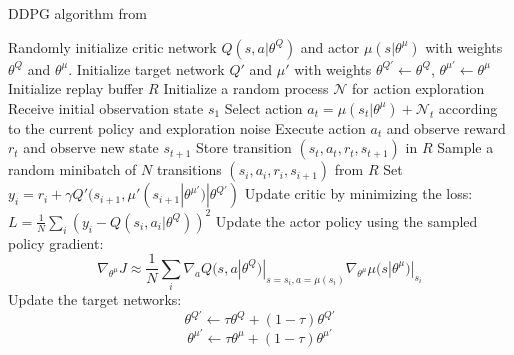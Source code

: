 \begin{algorithm}[H]
  \caption{DDPG algorithm from \cite{lillicrap2019continuouscontroldeepreinforcement}\label{algo:ddpg}}
  \begin{algorithmic}
    \STATE Randomly initialize critic network $Q(s, a | \theta^Q)$ and actor
    $\mu(s | \theta^{\mu})$ with weights $\theta^{Q}$ and $\theta^{\mu}$.
    \STATE Initialize target network $Q'$ and $\mu'$ with weights $\theta^{Q'}
    \leftarrow \theta^{Q}$, $\theta^{\mu'} \leftarrow \theta^{\mu}$
    \STATE Initialize replay buffer $R$
      \STATE Initialize a random process $\mathcal{N}$ for action
      exploration
      \STATE Receive initial observation state $s_1$
        \STATE Select action $a_t = \mu(s_t | \theta^{\mu}) + \mathcal{N}_t$
        according to the current policy and exploration noise
        \STATE Execute action $a_t$ and observe
        reward $r_t$ and observe new state $s_{t+1}$
        \STATE Store transition $(s_t, a_t,
                r_t, s_{t+1})$ in $R$
        \STATE Sample a random minibatch of $N$ transitions
               $(s_i, a_i,
        r_i, s_{i + 1})$ from $R$
        \STATE Set $ y_i = r_i + \gamma Q'(s_{i + 1},
        \mu'(s_{i+1} | \theta^{\mu'}) | \theta^{Q'}) $
        \STATE Update critic by minimizing the loss:
               $L = \frac{1}{N} \sum_i (y_i -
               Q(s_i, a_i | \theta^Q))^2$
        \STATE Update the actor policy using the sampled policy gradient:
        \begin{equation*}
            \nabla_{\theta^{\mu}} J \approx
            \frac{1}{N} \sum_i
               \nabla_{a} Q(s, a | \theta^Q)|_{s = s_i, a = \mu(s_i)}
               \nabla_{\theta^\mu} \mu(s | \theta^\mu)|_{s_i}
         \end{equation*}
        \STATE Update the target networks:
          \begin{equation*}
            \theta^{Q'} \leftarrow \tau \theta^{Q} + (1 - \tau) \theta^{Q'}
          \end{equation*}
          \begin{equation*}
            \theta^{\mu'} \leftarrow \tau \theta^{\mu} +
                (1 - \tau) \theta^{\mu'}
          \end{equation*}
        \ENDFOR
    \ENDFOR
  \end{algorithmic}
\end{algorithm}


